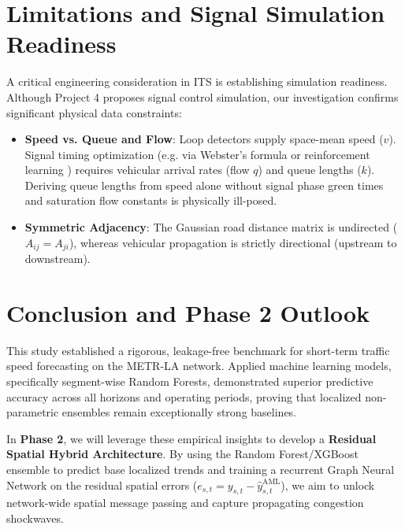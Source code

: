 \documentclass[conference]{IEEEtran}
\begin{document}
\section{Limitations and Signal Simulation Readiness}
A critical engineering consideration in ITS is establishing simulation readiness. Although Project 4 proposes signal control simulation, our investigation confirms significant physical data constraints:
\begin{itemize}
    \item \textbf{Speed vs. Queue and Flow}: Loop detectors supply space-mean speed ($v$). Signal timing optimization (e.g. via Webster's formula or reinforcement learning \cite{zheng2019cityflow}) requires vehicular arrival rates (flow $q$) and queue lengths ($k$). Deriving queue lengths from speed alone without signal phase green times and saturation flow constants is physically ill-posed.
    \item \textbf{Symmetric Adjacency}: The Gaussian road distance matrix is undirected ($A_{ij} = A_{ji}$), whereas vehicular propagation is strictly directional (upstream to downstream).
\end{itemize}

\section{Conclusion and Phase 2 Outlook}
This study established a rigorous, leakage-free benchmark for short-term traffic speed forecasting on the METR-LA network. Applied machine learning models, specifically segment-wise Random Forests, demonstrated superior predictive accuracy across all horizons and operating periods, proving that localized non-parametric ensembles remain exceptionally strong baselines.

In \textbf{Phase 2}, we will leverage these empirical insights to develop a \textbf{Residual Spatial Hybrid Architecture}. By using the Random Forest/XGBoost ensemble to predict base localized trends and training a recurrent Graph Neural Network on the residual spatial errors ($e_{s,t} = y_{s,t} - \hat{y}_{s,t}^{\text{AML}}$), we aim to unlock network-wide spatial message passing and capture propagating congestion shockwaves.



\end{document}
